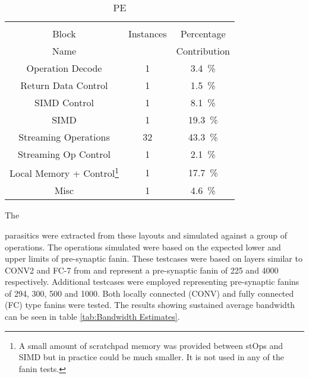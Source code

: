 \begin{table}[h]
  \bigskip
  \begin{subtable}{0.75\textwidth}
    \centering
    \begin{adjustbox}{width=0.85\textwidth}
      \begin{tabular}{ccc}
        \toprule
                         &          &                                          \\  %
            Block        &Instances & Percentage                               \\  %
            Name         &          & Contribution                             \\  %
        \hline  %
     Operation Decode    & 1&\SI[per-mode=symbol]{ 3.4}{\percent}  \\
   Return Data Control   & 1&\SI[per-mode=symbol]{ 1.5}{\percent}  \\
    SIMD Control         & 1&\SI[per-mode=symbol]{ 8.1}{\percent}  \\
        SIMD             & 1&\SI[per-mode=symbol]{19.3}{\percent}  \\
  Streaming Operations   &32&\SI[per-mode=symbol]{43.3}{\percent}  \\
  Streaming Op Control   & 1&\SI[per-mode=symbol]{ 2.1}{\percent}  \\
 Local Memory + Control\footnote{A small amount of scratchpad memory was provided between stOps and SIMD but in practice could be much smaller. It is not used in any of the fanin tests.}  & 1&\SI[per-mode=symbol]{17.7}{\percent}  \\ 
        Misc             & 1&\SI[per-mode=symbol]{ 4.6}{\percent}  \\
        \bottomrule
      \end{tabular}
    \end{adjustbox}
    \vspace{3pt}
    \captionsetup{justification=centering, skip=10pt}
    \caption{PE}
    \label{tab:PE Area Contribution}
  \end{subtable}
  \end{table}


\iffalse
Although the design is yet to close timing, the 
\else
The
\fi
parasitics were extracted from these layouts and simulated against a group of operations. 
The operations simulated were based on the expected lower and upper limits of pre-synaptic fanin. 
These testcases were based on layers similar to CONV2 and FC-7 from \cite{krizhevsky2012imagenet} and represent a pre-synaptic fanin of 225 and 4000 respectively.
Additional testcases were employed representing pre-synaptic fanins of 294, 300, 500 and 1000. Both locally connected (CONV) and fully connected (FC) type fanins were tested.
The results showing sustained average bandwidth can be seen in table \ref{tab:Bandwidth Estimates}.


